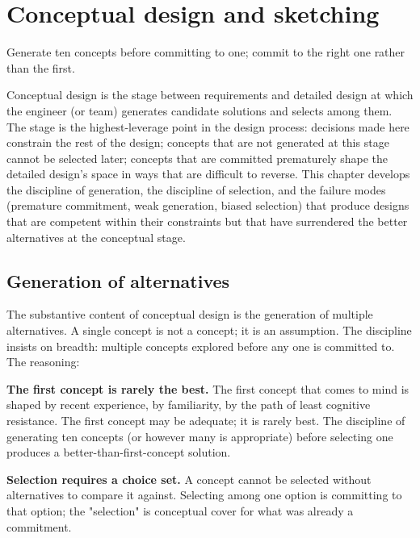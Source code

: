 \chapter{Conceptual design and sketching}
\label{vol11:ch04}

\epigraph{Generate ten concepts before committing to one; commit to the right one rather than the first.}{}


\noindent
Conceptual design is the stage between requirements and detailed design at which the engineer (or team) generates candidate solutions and selects among them. The stage is the highest-leverage point in the design process: decisions made here constrain the rest of the design; concepts that are not generated at this stage cannot be selected later; concepts that are committed prematurely shape the detailed design's space in ways that are difficult to reverse. This chapter develops the discipline of generation, the discipline of selection, and the failure modes (premature commitment, weak generation, biased selection) that produce designs that are competent within their constraints but that have surrendered the better alternatives at the conceptual stage.

\section{Generation of alternatives}

The substantive content of conceptual design is the generation of multiple alternatives. A single concept is not a concept; it is an assumption. The discipline insists on breadth: multiple concepts explored before any one is committed to. The reasoning:

\textbf{The first concept is rarely the best.} The first concept that comes to mind is shaped by recent experience, by familiarity, by the path of least cognitive resistance. The first concept may be adequate; it is rarely best. The discipline of generating ten concepts (or however many is appropriate) before selecting one produces a better-than-first-concept solution.

\textbf{Selection requires a choice set.} A concept cannot be selected without alternatives to compare it against. Selecting among one option is committing to that option; the "selection" is conceptual cover for what was already a commitment.


